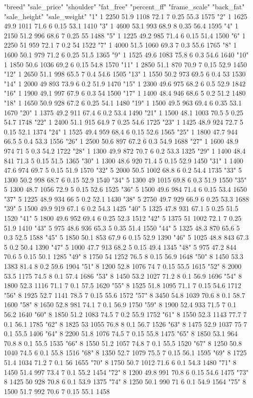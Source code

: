"breed" "sale_price" "shoulder" "fat_free" "percent_ff" "frame_scale" "back_fat" "sale_height" "sale_weight"
"1" 1 2250 51.9 1108 72.1 7 0.25 55.3 1575
"2" 1 1625 49.9 1011 71.6 6 0.15 53.1 1410
"3" 1 4600 53.1 993 68.9 8 0.35 56.4 1595
"4" 1 2150 51.2 996 68.6 7 0.25 55 1488
"5" 1 1225 49.2 985 71.4 6 0.15 51.4 1500
"6" 1 2250 51 959 72.1 7 0.2 54 1522
"7" 1 4000 51.5 1060 69.3 7 0.3 55.6 1765
"8" 1 1600 50.1 979 71.2 6 0.25 51.5 1365
"9" 1 1525 49.6 1083 75.8 6 0.3 54.6 1640
"10" 1 1850 50.6 1036 69.2 6 0.15 54.8 1570
"11" 1 2850 51.1 870 70.9 7 0.15 52.9 1450
"12" 1 2650 51.1 998 65.5 7 0.4 54.6 1505
"13" 1 1550 50.2 973 69.5 6 0.4 53 1530
"14" 1 2000 49 893 73.9 6 0.2 51.9 1470
"15" 1 2300 49.6 975 68.2 6 0.5 52.9 1842
"16" 1 1900 49.1 997 67.9 6 0.3 54 1500
"17" 1 1400 48.4 946 68.6 5 0.2 51.2 1480
"18" 1 1650 50.9 928 67.2 6 0.25 54.1 1480
"19" 1 1500 49.5 963 69.4 6 0.35 53.1 1670
"20" 1 1375 49.2 911 67.4 6 0.2 53.4 1490
"21" 1 1500 48.1 1003 70.5 5 0.25 54.7 1748
"22" 1 2400 51.1 915 64.9 7 0.25 54.6 1725
"23" 1 1425 48.9 924 72.7 5 0.15 52.1 1374
"24" 1 1525 49.4 959 68.4 6 0.15 52.6 1565
"25" 1 1800 47.7 944 66.5 5 0.4 53.3 1556
"26" 1 2500 50.6 897 67.2 6 0.3 54.9 1688
"27" 1 1600 48.9 974 71 5 0.3 54.2 1722
"28" 1 1300 49.9 872 70.7 6 0.2 53.3 1325
"29" 1 1400 48.4 841 71.3 5 0.15 51.5 1365
"30" 1 1300 48.6 920 71.4 5 0.15 52.9 1450
"31" 1 1400 47.6 974 69.7 5 0.15 51.9 1570
"32" 5 2000 50.5 1002 68.8 6 0.2 54.4 1735
"33" 5 1300 50.2 998 68.7 6 0.15 52.9 1540
"34" 5 1300 49 1015 69.8 6 0.3 51.9 1550
"35" 5 1300 48.7 1056 72.9 5 0.15 52.6 1525
"36" 5 1500 49.6 984 71.4 6 0.15 53.4 1650
"37" 5 1225 48.9 934 66 5 0.2 52.1 1430
"38" 5 2750 49.7 929 66.9 6 0.25 53.3 1688
"39" 5 1500 49.9 919 67.1 6 0.2 54.3 1425
"40" 5 1325 47.8 931 67.1 5 0.25 51.5 1520
"41" 5 1800 49.6 952 69.4 6 0.25 52.3 1512
"42" 5 1375 51 1002 72.1 7 0.25 51.9 1410
"43" 5 975 48.6 936 65.3 5 0.35 51.4 1550
"44" 5 1325 48.3 870 65.6 5 0.3 52.5 1588
"45" 5 1850 50.1 853 67.9 6 0.15 52.9 1390
"46" 5 1025 48.8 843 67.3 5 0.2 50.4 1390
"47" 5 1000 47.7 913 68.2 5 0.15 49.4 1345
"48" 5 975 47.2 844 70.6 5 0.15 50.1 1285
"49" 8 1750 54 1252 76.5 8 0.15 56.9 1648
"50" 8 1450 53.3 1383 81.4 8 0.2 59.6 1904
"51" 8 1200 52.8 1076 74 7 0.15 55.5 1615
"52" 8 2000 53.5 1175 74.5 8 0.1 57.4 1686
"53" 8 1450 53.2 1027 71.2 8 0.1 56.9 1696
"54" 8 1800 52.3 1116 71.1 7 0.1 57.5 1620
"55" 8 1525 51.8 1095 71.1 7 0.15 54.6 1712
"56" 8 1925 52.7 1141 78.5 7 0.15 55.6 1572
"57" 8 3450 54.8 1039 70.6 8 0.1 58.7 1600
"58" 8 1650 52.8 981 74.1 7 0.1 56.9 1750
"59" 8 1900 52.4 933 71.5 7 0.1 56.2 1640
"60" 8 1850 51.2 1083 74.5 7 0.2 55.9 1752
"61" 8 1550 52.3 1143 77.7 7 0.1 56.1 1785
"62" 8 1825 53 1055 76.8 8 0.1 56.7 1526
"63" 8 1475 52.9 1037 75 7 0.1 55.5 1406
"64" 8 2200 51.8 1076 74.5 7 0.15 55.8 1475
"65" 8 1850 53.1 964 70.8 8 0.1 55.5 1535
"66" 8 1550 51.2 1057 74.8 7 0.1 55.5 1520
"67" 8 1250 50.8 1040 74.5 6 0.1 55.8 1516
"68" 8 1350 52.7 1079 75.5 7 0.15 56.1 1595
"69" 8 1725 51.4 1034 71.2 7 0.1 56 1655
"70" 8 1750 50.7 1012 71.6 6 0.1 54.3 1480
"71" 8 1450 51.4 997 73.4 7 0.1 55.2 1454
"72" 8 1200 49.8 991 70.8 6 0.15 54.6 1475
"73" 8 1425 50 928 70.8 6 0.1 53.9 1375
"74" 8 1250 50.1 990 71 6 0.1 54.9 1564
"75" 8 1500 51.7 992 70.6 7 0.15 55.1 1458
